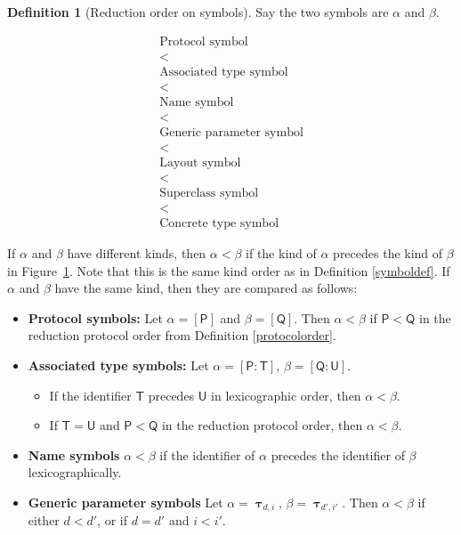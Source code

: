 \documentclass[a4paper,headsepline,bibliography=totoc,toc=flat,fleqn,twoside=semi]{scrbook}
\theoremstyle{definition}
\newtheorem{definition}{Definition}[chapter]
\theoremstyle{definition}
\theoremstyle{definition}
\newcommand{\namesym}[1]{\mathsf{#1}}
\newcommand{\proto}[1]{\bm{\mathsf{#1}}}
\newcommand{\protosym}[1]{[\proto{#1}]}
\newcommand{\genericsym}[2]{\bm{\uptau}_{#1,#2}}
\newcommand{\assocsym}[2]{[\proto{#1}\colon\namesym{#2}]}
\begin{document}
\begin{definition}[Reduction order on symbols]\label{symbolorder}
Say the two symbols are $\alpha$ and $\beta$.
\begin{figure}\label{kindorder}
\[
\begin{array}{c}
\text{Protocol symbol}\\
<\\
\text{Associated type symbol}\\
<\\
\text{Name symbol}\\
<\\
\text{Generic parameter symbol}\\
<\\
\text{Layout symbol}\\
<\\
\text{Superclass symbol}\\
<\\
\text{Concrete type symbol}
\end{array}
\]
\end{figure}

If $\alpha$ and $\beta$ have different kinds, then $\alpha<\beta$ if the kind of $\alpha$ precedes the kind of $\beta$ in Figure~\ref{kindorder}. Note that this is the same kind order as in Definition \ref{symboldef}.
If $\alpha$ and $\beta$ have the same kind, then they are compared as follows:

\begin{itemize}
\item \textbf{Protocol symbols:} Let $\alpha=\protosym{P}$ and $\beta=\protosym{Q}$. Then $\alpha<\beta$ if $\proto{P}<\proto{Q}$ in the reduction protocol order from Definition \ref{protocolorder}.
\item \textbf{Associated type symbols:} Let
$\alpha=\assocsym{P}{T}$, $\beta=\assocsym{Q}{U}$.
\begin{itemize}
\item If the identifier $\namesym{T}$ precedes $\namesym{U}$ in lexicographic order, then $\alpha < \beta$.
\item If $\namesym{T}=\namesym{U}$ and $\proto{P}<\proto{Q}$ in the reduction protocol order, then $\alpha < \beta$.
\end{itemize}
\item \textbf{Name symbols} $\alpha<\beta$ if the identifier of $\alpha$ precedes the identifier of $\beta$ lexicographically.
\item \textbf{Generic parameter symbols} Let $\alpha=\genericsym{d}{i}$, $\beta=\genericsym{d'}{i'}$. Then $\alpha < \beta$ if either $d<d'$, or if $d=d'$ and $i<i'$.
\end{itemize}
\end{definition}
\end{document}

